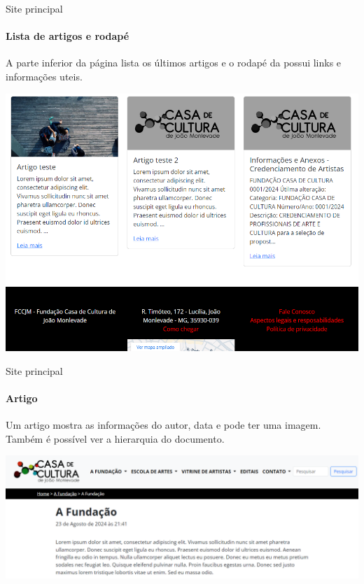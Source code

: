 \begin{frame}{Site principal}
\framesubtitle{Lista de artigos e rodapé}
A parte inferior da página lista os últimos artigos e o rodapé da possui links e informações uteis.  

\vspace{\baselineskip}

    \begin{center}
        \includegraphics[scale=0.25]{beamerthemesrc/assets/artigos_footer.png}
    \end{center}
\end{frame}

\begin{frame}{Site principal}
\framesubtitle{Artigo}
Um artigo mostra as informações do autor, data e pode ter uma imagem. Também é possível ver a hierarquia do documento.

\vspace{\baselineskip}

    \begin{center}
        \includegraphics[width=\textwidth]{beamerthemesrc/assets/artigo.png}
    \end{center}
\end{frame}

